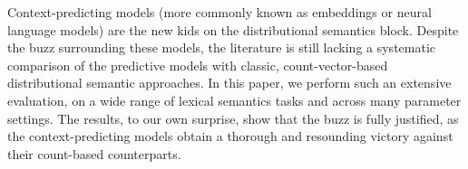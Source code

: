 Context-predicting models (more commonly known as embeddings or neural language models) are the new kids on the distributional semantics block. Despite the buzz surrounding these models, the literature is still lacking a systematic comparison of the predictive models with classic, count-vector-based distributional semantic approaches. In this paper, we perform such an extensive evaluation, on a wide range of lexical semantics tasks and across many parameter settings. The results, to our own surprise, show that the buzz is fully justified, as the context-predicting models obtain a thorough and resounding victory against their count-based counterparts.
